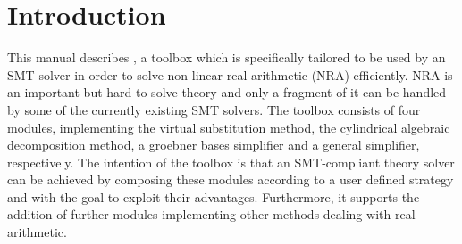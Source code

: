 \chapter{Introduction}
\label{chapter:intro}
This manual describes \smtrat, a toolbox which is specifically tailored to be
used by an SMT solver in order to solve non-linear real arithmetic
(NRA) efficiently.  NRA is an important but hard-to-solve theory and
only a fragment of it can be handled by some of the currently existing
SMT solvers.  The toolbox consists of four modules, implementing the
virtual substitution method, the cylindrical algebraic decomposition
method, a groebner bases simplifier and a general simplifier,
respectively. The intention of the toolbox is that an SMT-compliant
theory solver can be achieved by composing these modules according to
a user defined strategy and with the goal to exploit their advantages.
Furthermore, it supports the addition of further modules implementing
other methods dealing with real arithmetic.
